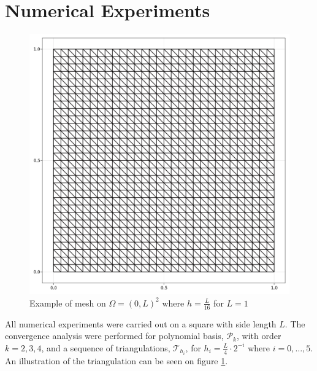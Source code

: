 


\newpage
\section{Numerical Experiments}%
\label{sub:manufactured_solution}

\begin{figure}[h!]
    \centering
    \includegraphics[width=0.4 \textwidth]{figures/model/l_1.0_m_1_r_1n_30_grid.png}
    \caption{Example of mesh on $ \Omega =  \left( 0,L  \right)^{2}$ where $h=\frac{L}{16}$ for $L=1$   }
    \label{fig:sol_l1_m1_r1}
\end{figure}
All numerical experiments were carried out on a square with side length $L$. The convergence analysis were performed for polynomial basis, $\mathcal{P}_{k} $, with order $k=2,3,4$, and a sequence of triangulations, $\mathcal{T} _{h_i}$, for $h_i =
\frac{L}{4}\cdot 2^{-i}$ where $ i =0,\ldots,5 $.
An illustration of the triangulation can be seen on figure \ref{fig:sol_l1_m1_r1}.

